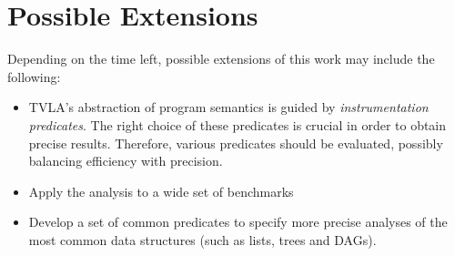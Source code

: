 \documentclass[12pt,a4paper]{article}
\begin{document}
\section*{Possible Extensions}
Depending on the time left, possible extensions of this work may include the following:
\begin{itemize}
  \item  TVLA's abstraction of program semantics is guided  by \textit{instrumentation predicates}. The right choice of these predicates is crucial in order to obtain precise results. Therefore, various predicates should be evaluated, possibly balancing efficiency with precision.
  \item Apply the analysis to a wide set of benchmarks
  \item Develop a set of common predicates to specify more precise analyses of the most common data structures (such as lists, trees and DAGs).
\end{itemize}
\end{document}
